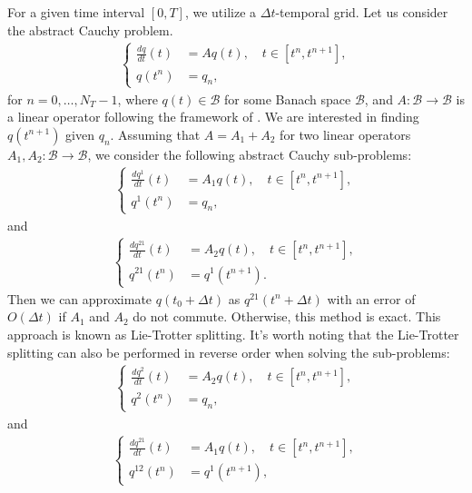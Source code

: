 For a given time interval $[0,T]$, we utilize a $\Delta t$-temporal grid. Let us consider the abstract Cauchy problem.
\begin{align*}
	\begin{cases}
		\frac{dq}{dt}(t) &= Aq(t), \quad t \in [t^n,t^{n+1}],\\
		q(t^n) &= q_n,
	\end{cases}
\end{align*}
for $n=0,\ldots, N_T-1$, where $q(t) \in \mathcal{B}$ for some Banach space $\mathcal{B}$, and $A:\mathcal{B} \to \mathcal{B}$ is a linear operator
following the framework of \citet[Chapter~3]{richtmyer:1968}.
We are interested in finding $q(t^{n+1})$ given $q_n$.
Assuming that $A = A_1 + A_2$ for two linear operators $A_1, A_2:\mathcal{B} \to \mathcal{B}$, we consider the following abstract Cauchy sub-problems:
\begin{align*}
	\begin{cases}
		\frac{dq^1}{dt}(t) &= A_1q(t), \quad t \in [t^{n},t^{n+1}],\\
		q^{1}(t^n) &= q_n,
	\end{cases}
\end{align*}
and
\begin{align*}
	\begin{cases}
		\frac{dq^{21}}{dt}(t) &= A_2q(t), \quad t \in [t^n,t^{n+1}],\\
		q^{21}(t^n) &= q^1(t^{n+1}).
	\end{cases}
\end{align*}
Then we can approximate $q(t_0 + \Delta t)$ as $q^{21}(t^n + \Delta t)$ 
with an error of $O(\Delta t)$ if $A_1$ and $A_2$ do not commute. 
Otherwise, this method is exact.
This approach is known as Lie-Trotter splitting. 
It's worth noting that the Lie-Trotter splitting can also be performed in reverse order when solving the sub-problems:
\begin{align*}
	\begin{cases}
		\frac{dq^2}{dt}(t) &= A_2q(t), \quad t \in [t^n,t^{n+1}],\\
		q^{2}(t^n) &= q_n,
	\end{cases}
\end{align*}
and 
\begin{align*}
	\begin{cases}
		\frac{dq^{21}}{dt}(t) &= A_1q(t), \quad t \in [t^n,t^{n+1}],\\
		q^{12}(t^n) &= q^1(t^{n+1}),
	\end{cases}
\end{align*}
